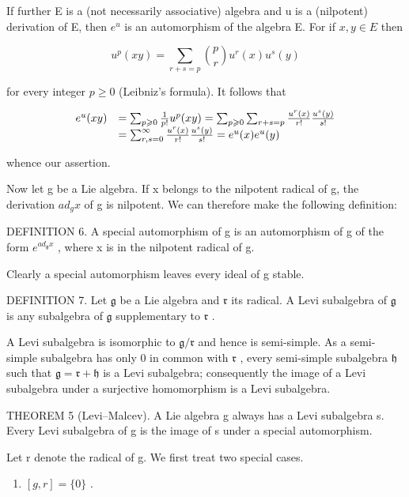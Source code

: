 If further E is a (not necessarily associative) algebra and u is a (nilpotent) derivation of E, then \(e^{u}\) is an automorphism of the algebra E. For if \(x, y \in E\) then

\[
u ^ {p} (x y) = \sum_ {r + s = p} \binom {p} {r} u ^ {r} (x) u ^ {s} (y)
\]

for every integer \(p \geqslant 0\) (Leibniz's formula). It follows that

\[
\begin{array}{r l} e ^ {u} (x y) & = \sum_ {p \geqslant 0} \frac {1}{p !} u ^ {p} (x y) = \sum_ {p \geqslant 0} \sum_ {r + s = p} \frac {u ^ {r} (x)}{r !} \frac {u ^ {s} (y)}{s !} \\ & = \sum_ {r, s = 0} ^ {\infty} \frac {u ^ {r} (x)}{r !} \frac {u ^ {s} (y)}{s !} = e ^ {u} (x) e ^ {u} (y) \end{array}
\]

whence our assertion.

Now let g be a Lie algebra. If x belongs to the nilpotent radical of g, the derivation \(ad_{g}x\) of g is nilpotent. We can therefore make the following definition:

DEFINITION 6. A special automorphism of g is an automorphism of g of the form \(e^{ad_{\mathfrak{g}} x}\) , where x is in the nilpotent radical of g.

Clearly a special automorphism leaves every ideal of g stable.

DEFINITION 7. Let \(\mathfrak{g}\) be a Lie algebra and \(\mathfrak{r}\) its radical. A Levi subalgebra of \(\mathfrak{g}\) is any subalgebra of \(\mathfrak{g}\) supplementary to \(\mathfrak{r}\) .

A Levi subalgebra is isomorphic to \(\mathfrak{g} / \mathfrak{r}\) and hence is semi-simple. As a semi-simple subalgebra has only 0 in common with \(\mathfrak{r}\) , every semi-simple subalgebra \(\mathfrak{h}\) such that \(\mathfrak{g} = \mathfrak{r} + \mathfrak{h}\) is a Levi subalgebra; consequently the image of a Levi subalgebra under a surjective homomorphism is a Levi subalgebra.

THEOREM 5 (Levi--Malcev). A Lie algebra g always has a Levi subalgebra s. Every Levi subalgebra of g is the image of s under a special automorphism.

Let r denote the radical of g. We first treat two special cases.

\begin{enumerate}
\def\labelenumi{(\alph{enumi})}
\tightlist
\item
  \([g, r] = \{0\}\) .
\end{enumerate}

